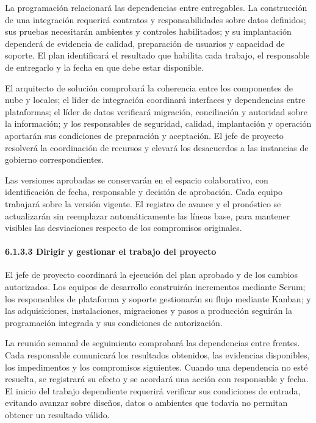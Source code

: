 \documentclass[11pt]{article}
\begin{document}
La programación relacionará las dependencias entre entregables. La
construcción de una integración requerirá contratos y responsabilidades
sobre datos definidos; sus pruebas necesitarán ambientes y controles
habilitados; y su implantación dependerá de evidencia de calidad,
preparación de usuarios y capacidad de soporte. El plan identificará el
resultado que habilita cada trabajo, el responsable de entregarlo y la
fecha en que debe estar disponible.

El arquitecto de solución comprobará la coherencia entre los componentes
de nube y locales; el líder de integración coordinará interfaces y
dependencias entre plataformas; el líder de datos verificará migración,
conciliación y autoridad sobre la información; y los responsables de
seguridad, calidad, implantación y operación aportarán sus condiciones
de preparación y aceptación. El jefe de proyecto resolverá la
coordinación de recursos y elevará los desacuerdos a las instancias de
gobierno correspondientes.

Las versiones aprobadas se conservarán en el espacio colaborativo, con
identificación de fecha, responsable y decisión de aprobación. Cada
equipo trabajará sobre la versión vigente. El registro de avance y el
pronóstico se actualizarán sin reemplazar automáticamente las líneas
base, para mantener visibles las desviaciones respecto de los
compromisos originales.

\paragraph{6.1.3.3 Dirigir y gestionar el trabajo del proyecto}\label{6-1-3-3-dirigir-y-gestionar-el-trabajo-del-proyecto}

El jefe de proyecto coordinará la ejecución del plan aprobado y de los cambios autorizados. Los equipos de desarrollo construirán incrementos mediante Scrum; los responsables de plataforma y soporte gestionarán su flujo mediante Kanban; y las adquisiciones, instalaciones, migraciones y pasos a producción seguirán la programación integrada y sus condiciones de autorización.

La reunión semanal de seguimiento comprobará las dependencias entre
frentes. Cada responsable comunicará los resultados obtenidos, las
evidencias disponibles, los impedimentos y los compromisos siguientes.
Cuando una dependencia no esté resuelta, se registrará su efecto y se
acordará una acción con responsable y fecha. El inicio del trabajo
dependiente requerirá verificar sus condiciones de entrada, evitando
avanzar sobre diseños, datos o ambientes que todavía no permitan obtener
un resultado válido.
\end{document}
